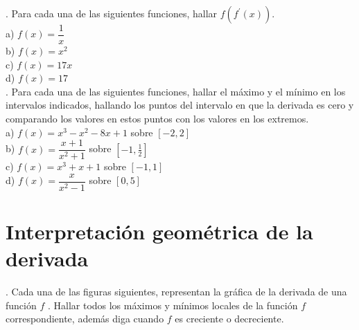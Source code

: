 \documentclass[letterpaper]{article}
\newcommand{\fp}[1]{#1^{\prime}}
\begin{document}

. Para cada una de las siguientes funciones, hallar $ f(\fp{f} (x)) $.\\

a) $ f(x) = \dfrac{1}{x} $\\


b) $ f(x) = x^{2} $\\


c) $ f(x) = 17x $\\


d) $ f(x) = 17 $\\


. Para cada una de las siguientes funciones, hallar el máximo y el mínimo en los intervalos indicados, hallando los puntos del intervalo en que la derivada es cero y comparando los valores en estos puntos con los valores en los extremos.\\

a) $ f(x) = x^{3} -x^{2} -8x +1$ sobre $ [-2,2] $\\


b) $ f(x) = \dfrac{x+1}{x^{2}+1}$ sobre $ [-1,\frac{1}{2}] $\\


c) $ f(x) = x^{3} +x +1$ sobre $ [-1,1] $\\


d) $ f(x) = \dfrac{x}{x^{2} - 1}$ sobre $ [0,5] $\\


\section*{Interpretación geométrica de la derivada}

. Cada una de las figuras siguientes, representan la gráfica de la derivada de una función $ f $ . Hallar todos los máximos y mínimos locales de la función $ f $ correspondiente, además diga cuando $ f $ es creciente o decreciente.\\
\end{document}
